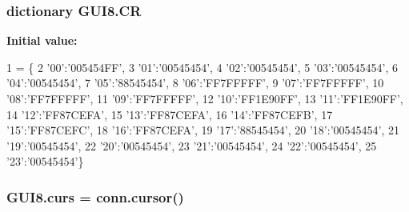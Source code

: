 \subsubsection[{\texorpdfstring{CR}{CR}}]{\setlength{\rightskip}{0pt plus 5cm}dictionary G\+U\+I8.\+CR}\hypertarget{namespaceGUI8_a431c9ff481f8df6f970a9227b18630ec}{}\label{namespaceGUI8_a431c9ff481f8df6f970a9227b18630ec}
{\bfseries Initial value\+:}
\begin{DoxyCode}
1 = \{
2 \textcolor{stringliteral}{'00'}:\textcolor{stringliteral}{'005454FF'},
3 \textcolor{stringliteral}{'01'}:\textcolor{stringliteral}{'00545454'},
4 \textcolor{stringliteral}{'02'}:\textcolor{stringliteral}{'00545454'},
5 \textcolor{stringliteral}{'03'}:\textcolor{stringliteral}{'00545454'},
6 \textcolor{stringliteral}{'04'}:\textcolor{stringliteral}{'00545454'},
7 \textcolor{stringliteral}{'05'}:\textcolor{stringliteral}{'88545454'},
8 \textcolor{stringliteral}{'06'}:\textcolor{stringliteral}{'FF7FFFFF'},
9 \textcolor{stringliteral}{'07'}:\textcolor{stringliteral}{'FF7FFFFF'},
10 \textcolor{stringliteral}{'08'}:\textcolor{stringliteral}{'FF7FFFFF'},
11 \textcolor{stringliteral}{'09'}:\textcolor{stringliteral}{'FF7FFFFF'},
12 \textcolor{stringliteral}{'10'}:\textcolor{stringliteral}{'FF1E90FF'},
13 \textcolor{stringliteral}{'11'}:\textcolor{stringliteral}{'FF1E90FF'},
14 \textcolor{stringliteral}{'12'}:\textcolor{stringliteral}{'FF87CEFA'},
15 \textcolor{stringliteral}{'13'}:\textcolor{stringliteral}{'FF87CEFA'},
16 \textcolor{stringliteral}{'14'}:\textcolor{stringliteral}{'FF87CEFB'},
17 \textcolor{stringliteral}{'15'}:\textcolor{stringliteral}{'FF87CEFC'},
18 \textcolor{stringliteral}{'16'}:\textcolor{stringliteral}{'FF87CEFA'},
19 \textcolor{stringliteral}{'17'}:\textcolor{stringliteral}{'88545454'},
20 \textcolor{stringliteral}{'18'}:\textcolor{stringliteral}{'00545454'},
21 \textcolor{stringliteral}{'19'}:\textcolor{stringliteral}{'00545454'},
22 \textcolor{stringliteral}{'20'}:\textcolor{stringliteral}{'00545454'},
23 \textcolor{stringliteral}{'21'}:\textcolor{stringliteral}{'00545454'},
24 \textcolor{stringliteral}{'22'}:\textcolor{stringliteral}{'00545454'},
25 \textcolor{stringliteral}{'23'}:\textcolor{stringliteral}{'00545454'}\}
\end{DoxyCode}
\subsubsection[{\texorpdfstring{curs}{curs}}]{\setlength{\rightskip}{0pt plus 5cm}G\+U\+I8.\+curs = conn.\+cursor()}\hypertarget{namespaceGUI8_a9d14617d09e50247fc7d7b65ea35c514}{}\label{namespaceGUI8_a9d14617d09e50247fc7d7b65ea35c514}
